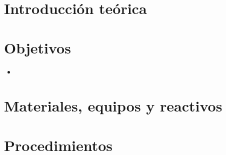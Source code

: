 \SetPractica{}{} %

\section{Introducción teórica}



\section{Objetivos}

\begin{itemize}
    \item 
\end{itemize}

\section{Materiales, equipos y reactivos}

\begin{table}[H]
\end{table}

\section{Procedimientos}

